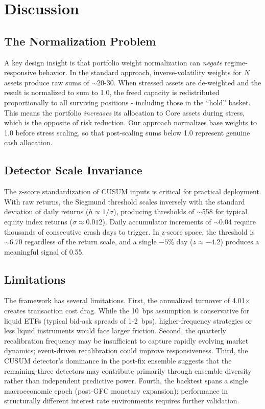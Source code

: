 \documentclass[11pt]{article}
\begin{document}
\section{Discussion}

\subsection{The Normalization Problem}

A key design insight is that portfolio weight normalization can
\emph{negate} regime-responsive behavior.  In the standard approach,
inverse-volatility weights for $N$ assets produce raw sums of
$\sim 20$-$30$.  When stressed assets are de-weighted and the result
is normalized to sum to 1.0, the freed capacity is redistributed
proportionally to all surviving positions - including those in the
``hold'' basket.  This means the portfolio \emph{increases} its
allocation to Core assets during stress, which is the opposite of
risk reduction.  Our approach normalizes base weights to 1.0 before
stress scaling, so that post-scaling sums below 1.0 represent genuine
cash allocation.

\subsection{Detector Scale Invariance}

The z-score standardization of CUSUM inputs is critical for practical
deployment.  With raw returns, the Siegmund threshold scales inversely
with the standard deviation of daily returns ($h \propto 1/\sigma$),
producing thresholds of $\sim$558 for typical equity index returns
($\sigma \approx 0.012$).  Daily accumulator increments of $\sim$0.04
require thousands of consecutive crash days to trigger.  In z-score
space, the threshold is $\sim$6.70 regardless of the return scale,
and a single $-5\%$ day ($z \approx -4.2$) produces a meaningful
signal of 0.55.

\subsection{Limitations}

The framework has several limitations.  First, the annualized turnover
of 4.01$\times$ creates transaction cost drag.  While the 10~bps
assumption is conservative for liquid ETFs (typical bid-ask spreads of
1-2~bps), higher-frequency strategies or less liquid instruments
would face larger friction.  Second, the quarterly recalibration
frequency may be insufficient to capture rapidly evolving market
dynamics; event-driven recalibration could improve responsiveness.
Third, the CUSUM detector's dominance in the post-fix ensemble
suggests that the remaining three detectors may contribute primarily
through ensemble diversity rather than independent predictive power.
Fourth, the backtest spans a single macroeconomic epoch (post-GFC
monetary expansion); performance in structurally different interest
rate environments requires further validation.
\end{document}
